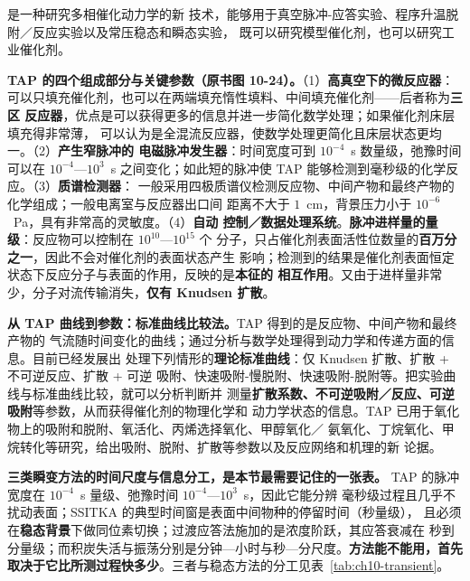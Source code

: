 是一种研究多相催化动力学的新
技术，能够用于真空脉冲-应答实验、程序升温脱附／反应实验以及常压稳态和瞬态实验，
既可以研究模型催化剂，也可以研究工业催化剂。

\begin{measure}
\textbf{TAP 的四个组成部分与关键参数（原书图 10-24）。}（1）\textbf{高真空下的微反应器}：
可以只填充催化剂，也可以在两端填充惰性填料、中间填充催化剂——后者称为\textbf{三区
反应器}，优点是可以获得更多的信息并进一步简化数学处理；如果催化剂床层填充得非常薄，
可以认为是全混流反应器，使数学处理更简化且床层状态更均一。（2）\textbf{产生窄脉冲的
电磁脉冲发生器}：时间宽度可到 $10^{-4}$~s 数量级，弛豫时间可以在 $10^{-4}$—$10^{3}$~s
之间变化；如此短的脉冲使 TAP 能够检测到毫秒级的化学反应。（3）\textbf{质谱检测器}：
一般采用四极质谱仪检测反应物、中间产物和最终产物的化学组成；一般电离室与反应器出口间
距离不大于 $1$~cm，背景压力小于 $10^{-6}$~Pa，具有非常高的灵敏度。（4）\textbf{自动
控制／数据处理系统}。\textbf{脉冲进样量的量级}：反应物可以控制在 $10^{10}$—$10^{15}$ 个
分子，只占催化剂表面活性位数量的\textbf{百万分之一}，因此不会对催化剂的表面状态产生
影响；检测到的结果是催化剂表面恒定状态下反应分子与表面的作用，反映的是\textbf{本征的
相互作用}。又由于进样量非常少，分子对流传输消失，\textbf{仅有 Knudsen 扩散}。
\end{measure}

\begin{dataflow}
\textbf{从 TAP 曲线到参数：标准曲线比较法。}TAP 得到的是反应物、中间产物和最终产物的
气流随时间变化的曲线；通过分析与数学处理得到动力学和传递方面的信息。目前已经发展出
处理下列情形的\textbf{理论标准曲线}：仅 Knudsen 扩散、扩散 + 不可逆反应、扩散 + 可逆
吸附、快速吸附-慢脱附、快速吸附-脱附等。把实验曲线与标准曲线比较，就可以分析判断并
测量\textbf{扩散系数、不可逆吸附／反应、可逆吸附}等参数，从而获得催化剂的物理化学和
动力学状态的信息。TAP 已用于氧化物上的吸附和脱附、氧活化、丙烯选择氧化、甲醇氧化／
氨氧化、丁烷氧化、甲烷转化等研究，给出吸附、脱附、扩散等参数以及反应网络和机理的新
论据。
\end{dataflow}

\begin{crosscheck}
\textbf{三类瞬变方法的时间尺度与信息分工，是本节最需要记住的一张表。}
TAP 的脉冲宽度在 $10^{-4}$~s 量级、弛豫时间 $10^{-4}$—$10^{3}$~s，因此它能分辨
毫秒级过程且几乎不扰动表面；SSITKA 的典型时间窗是表面中间物种的停留时间（秒量级），
且必须在\textbf{稳态背景}下做同位素切换；过渡应答法施加的是浓度阶跃，其应答衰减在
秒到分量级；而积炭失活与振荡分别是分钟—小时与秒—分尺度。\textbf{方法能不能用，首先
取决于它比所测过程快多少}。三者与稳态方法的分工见表~\ref{tab:ch10-transient}。
\end{crosscheck}

